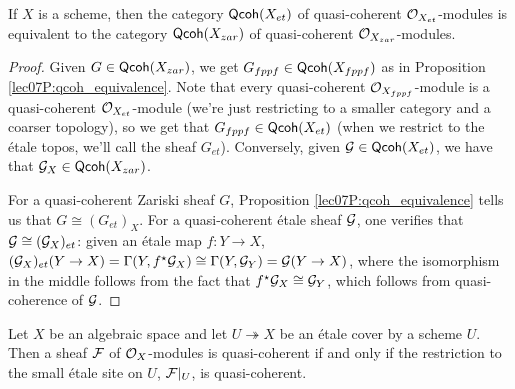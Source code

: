  \begin{lemma}\label{lec15L:qco_equivalence}
   If $X$ is a scheme, then the category $\text{\sf Qcoh}(X_{et})$ of quasi-coherent
   $\mathcal{O}_{X_{et}}$-modules is equivalent to the category $\text{\sf Qcoh}(X_{zar})$ of quasi-coherent
   $\mathcal{O}_{X_{zar}}$-modules.
 \end{lemma}
 \begin{proof}
   Given $G\in \text{\sf Qcoh}(X_{zar})$, we get $G_{fppf}\in \text{\sf Qcoh}(X_{fppf})$ as in  Proposition
   \ref{lec07P:qcoh_equivalence}. Note that every quasi-coherent $\mathcal{O}_{X_{fppf}}$-module
   is a quasi-coherent $\mathcal{O}_{X_{et}}$-module (we're just restricting to a smaller category
   and a coarser topology), so we get that $G_{fppf}\in \text{\sf Qcoh}(X_{et})$ (when we restrict
   to the \'etale topos, we'll call the sheaf $G_{et}$). Conversely, given $\mathcal{G}\in
   \text{\sf Qcoh}(X_{et})$, we have that $\mathcal{G}_X\in \text{\sf Qcoh}(X_{zar})$.

   For a quasi-coherent Zariski sheaf $G$, Proposition \ref{lec07P:qcoh_equivalence}
   tells us that $G\cong (G_{et})_X$. For a quasi-coherent \'etale sheaf $\mathcal{G}$, one
   verifies that $\mathcal{G}\cong (\mathcal{G}_X)_{et}$: given an \'etale map $f:Y\to X$,
   $(\mathcal{G}_X)_{et}(Y\to X)=\Gamma(Y,f^\star\mathcal{G}_X)\cong \Gamma(Y,\mathcal{G}_Y) = \mathcal{G}(Y\to X)$, where the
   isomorphism in the middle follows from the fact that $f^\star\mathcal{G}_X\cong  \mathcal{G}_Y$, which
   follows from quasi-coherence of $\mathcal{G}$.
 \end{proof}
 \begin{lemma}
 \label{lec15L:quasi-compact_etale_local}
   Let $X$ be an algebraic space and let $U\twoheadrightarrow X$ be an \'etale cover by a
   scheme $U$. Then a sheaf $\mathcal{F}$ of $\mathcal{O}_X$-modules is quasi-coherent if and only if
   the restriction to the small \'etale site on $U$, $\mathcal{F}|_U$, is quasi-coherent.
 \end{lemma}
